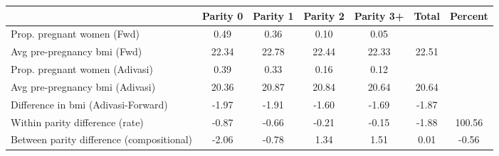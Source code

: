 \begin{tabular}{l*{6}{c}}
\toprule
            &\multicolumn{1}{c}{Parity 0}&\multicolumn{1}{c}{Parity 1}&\multicolumn{1}{c}{Parity 2}&\multicolumn{1}{c}{Parity 3+}&\multicolumn{1}{c}{Total}&\multicolumn{1}{c}{Percent}\\
\midrule
\midrule
Prop. pregnant women (Fwd)&        0.49&        0.36&        0.10&        0.05&            &            \\
Avg pre-pregnancy bmi (Fwd)&       22.34&       22.78&       22.44&       22.33&       22.51&            \\
Prop. pregnant women (Adivasi)&        0.39&        0.33&        0.16&        0.12&            &            \\
Avg pre-pregnancy bmi (Adivasi)&       20.36&       20.87&       20.84&       20.64&       20.64&            \\
Difference in bmi (Adivasi-Forward)&       -1.97&       -1.91&       -1.60&       -1.69&       -1.87&            \\
Within parity difference (rate)&       -0.87&       -0.66&       -0.21&       -0.15&       -1.88&      100.56\\
Between parity difference (compositional)&       -2.06&       -0.78&        1.34&        1.51&        0.01&       -0.56\\
\bottomrule
\end{tabular}
